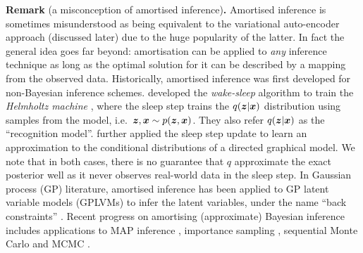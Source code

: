 \vspace{1em}
\begin{tcolorbox}
\textbf{Remark} (a misconception of amortised inference)\textbf{.}
Amortised inference is sometimes misunderstood as being equivalent to the variational auto-encoder \citep{kingma:vae2014, rezende:vae2014} approach (discussed later) due to the huge popularity of the latter. In fact the general idea goes far beyond: amortisation can be applied to \emph{any} inference technique as long as the optimal solution for it can be described by a mapping from the observed data. 
%
Historically, amortised inference was first developed for non-Bayesian inference schemes. \cite{hinton:ws1995} developed the \emph{wake-sleep} algorithm to train the \emph{Helmholtz machine} \citep{dayan:helmholtz1995}, where the sleep step trains the $q(\bm{z} | \bm{x})$ distribution using samples from the model, i.e.~$\bm{z}, \bm{x} \sim p(\bm{z}, \bm{x})$. They also refer $q(\bm{z} | \bm{x})$ as the ``recognition model''. \cite{morris:recognition2001} further applied the sleep step update to learn an approximation to the conditional distributions of a directed graphical model. We note that in both cases, there is no guarantee that $q$ approximate the exact posterior well as it never observes real-world data in the sleep step. 
%
In Gaussian process (GP) literature, amortised inference has been applied to GP latent variable models (GPLVMs) to infer the latent variables, under the name ``back constraints'' \citep{lawrence:gp_back_constraint2006}. 
%
Recent progress on amortising (approximate) Bayesian inference includes applications to MAP inference \citep{sonderby:mapsr2016}, importance sampling \citep{burda:iwae2016}, sequential Monte Carlo \citep{paige:smc2016, le:aesmc2017, maddison:fivo2017, naesseth:vsmc2017} and MCMC \citep{li:amcmc2017}. 

\end{tcolorbox}

